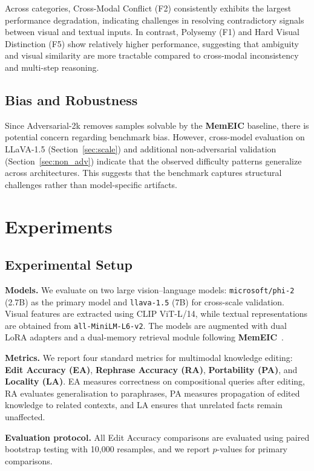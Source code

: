 \documentclass{article}
\newcommand{\memeic}{\textbf{MemEIC}}
\begin{document}
Across categories, Cross-Modal Conflict (F2) consistently exhibits the largest performance degradation, indicating challenges in resolving contradictory signals between visual and textual inputs. In contrast, Polysemy (F1) and Hard Visual Distinction (F5) show relatively higher performance, suggesting that ambiguity and visual similarity are more tractable compared to cross-modal inconsistency and multi-step reasoning.

\subsection{Bias and Robustness}

Since Adversarial-2k removes samples solvable by the \memeic{} baseline, there is potential concern regarding benchmark bias. However, cross-model evaluation on LLaVA-1.5 (Section~\ref{sec:scale}) and additional non-adversarial validation (Section~\ref{sec:non_adv}) indicate that the observed difficulty patterns generalize across architectures. This suggests that the benchmark captures structural challenges rather than model-specific artifacts.


\section{Experiments}

\subsection{Experimental Setup}
\label{sec:setup}

\textbf{Models.} We evaluate on two large vision--language models: \texttt{microsoft/phi-2} (2.7B) as the primary model and \texttt{llava-1.5} (7B) for cross-scale validation. Visual features are extracted using CLIP ViT-L/14, while textual representations are obtained from \texttt{all-MiniLM-L6-v2}. The models are augmented with dual LoRA adapters and a dual-memory retrieval module following \memeic{}~\cite{memeic2025}.

\textbf{Metrics.} We report four standard metrics for multimodal knowledge editing: \textbf{Edit Accuracy (EA)}, \textbf{Rephrase Accuracy (RA)}, \textbf{Portability (PA)}, and \textbf{Locality (LA)}. EA measures correctness on compositional queries after editing, RA evaluates generalisation to paraphrases, PA measures propagation of edited knowledge to related contexts, and LA ensures that unrelated facts remain unaffected.

\textbf{Evaluation protocol.} All Edit Accuracy comparisons are evaluated using paired bootstrap testing with 10{,}000 resamples, and we report $p$-values for primary comparisons.
\end{document}
